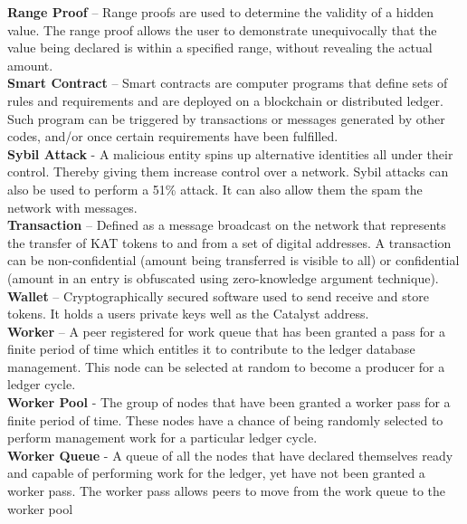 \textbf{Range Proof} – Range proofs are used to determine the validity of a hidden value. The range proof allows the user to demonstrate unequivocally that the value being declared is within a specified range, without revealing the actual amount. \\

\textbf{Smart Contract} – Smart contracts are computer programs that define sets of rules and requirements and are deployed on a blockchain or distributed ledger. Such program can be triggered by transactions or messages generated by other codes, and/or once certain requirements have been fulfilled. \\

\textbf{Sybil Attack} - A malicious entity spins up alternative identities all under their control. Thereby giving them increase control over a network. Sybil attacks can also be used to perform a 51\% attack. It can also allow them the spam the network with messages. \\

\textbf{Transaction} – Defined as a message broadcast on the network that represents the transfer of KAT tokens to and from a set of digital addresses. A transaction can be non-confidential (amount being transferred is visible to all) or confidential (amount in an entry is obfuscated using zero-knowledge argument technique). \\

\textbf{Wallet} – Cryptographically secured software used to send receive and store tokens. It holds a users private keys well as the Catalyst address.\\

\textbf{Worker} – A peer registered for work queue that has been granted a pass for a finite period of time which entitles it to contribute to the ledger database management. This node can be selected at random to become a producer for a ledger cycle. \\

\textbf{Worker Pool} - The group of nodes that have been granted a worker pass for a finite period of time. These nodes have a chance of being randomly selected to perform management work for a particular ledger cycle. \\

\textbf{Worker Queue} - A queue of all the nodes that have declared themselves ready and capable of performing work for the ledger, yet have not been granted a worker pass. The worker pass allows peers to move from the work queue to the worker pool\\


